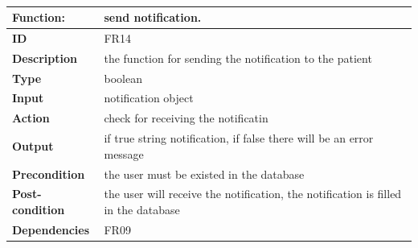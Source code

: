 \documentclass[]{article}
\begin{document}
\FloatBarrier
\begin{table}[h]
\caption{}
\label{tab:my-table}
\begin{tabular}{|p{}|p{}|}
\hline
\textbf{Function:} & send notification.
\\ \hline
\textbf{ID}  & FR14           

\\ \hline
\textbf{Description}    & the function for sending the notification to the patient                                                                 
\\ \hline
\textbf{Type}    &  boolean       

\\ \hline
\textbf{Input}        & notification object


\\ \hline
\textbf{Action}            & check for receiving the notificatin 

\\ \hline
\textbf{Output}            & if true string notification, if false there will be an error message 

\\ \hline
\textbf{Precondition}           & the user must be existed in the database  

\\ \hline
\textbf{Post-condition}           & the user will receive the notification, the notification is filled in the database


\\ \hline
\textbf{Dependencies}           & FR09
\\ \hline
\end{tabular}
\end{table}
\FloatBarrier
\end{document}
